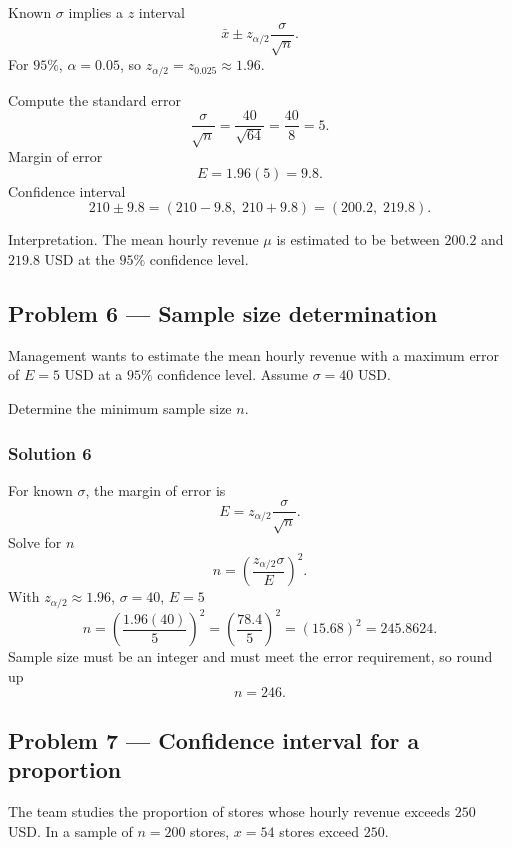 Known $\sigma$ implies a $z$ interval
\[
\bar{x} \pm z_{\alpha/2}\frac{\sigma}{\sqrt{n}}.
\]
For $95\%$, $\alpha = 0.05$, so $z_{\alpha/2} = z_{0.025} \approx 1.96$.

Compute the standard error
\[
\frac{\sigma}{\sqrt{n}} = \frac{40}{\sqrt{64}} = \frac{40}{8} = 5.
\]
Margin of error
\[
E = 1.96(5) = 9.8.
\]
Confidence interval
\[
210 \pm 9.8 = (210 - 9.8,\;210 + 9.8) = (200.2,\;219.8).
\]

Interpretation. The mean hourly revenue $\mu$ is estimated to be between $200.2$ and $219.8$ USD at the $95\%$ confidence level.


\subsection*{Problem 6 — Sample size determination}

Management wants to estimate the mean hourly revenue with a maximum error of $E = 5$ USD at a $95\%$ confidence level. Assume $\sigma = 40$ USD.

Determine the minimum sample size $n$.

\subsubsection*{Solution 6}

For known $\sigma$, the margin of error is
\[
E = z_{\alpha/2}\frac{\sigma}{\sqrt{n}}.
\]
Solve for $n$
\[
n = \left(\frac{z_{\alpha/2}\sigma}{E}\right)^2.
\]
With $z_{\alpha/2} \approx 1.96$, $\sigma = 40$, $E = 5$
\[
n = \left(\frac{1.96(40)}{5}\right)^2
= \left(\frac{78.4}{5}\right)^2
= (15.68)^2
= 245.8624.
\]
Sample size must be an integer and must meet the error requirement, so round up
\[
n = 246.
\]


\subsection*{Problem 7 — Confidence interval for a proportion}

The team studies the proportion of stores whose hourly revenue exceeds $250$ USD. In a sample of $n = 200$ stores, $x = 54$ stores exceed $250$.


